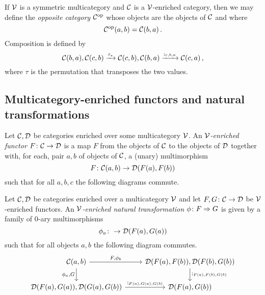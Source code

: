 \documentclass{article}
\begin{document}
\begin{remark}
  If ${\mathcal{V}}$ is a symmetric multicategory and ${\mathcal{C}}$ is a ${\mathcal{V}}$-enriched category, then we may define the \emph{opposite category} ${\mathcal{C}}^{\mathrm{op}}$ whose objects are the objects of ${\mathcal{C}}$ and where
  \[
    {\mathcal{C}}^{\mathrm{op}}(a,b)={\mathcal{C}}(b,a)\,.
    \]
  Composition is defined by
  \[
    {\mathcal{C}}(b,a),{\mathcal{C}}(c,b) \xrightarrow{\tau_*}
    {\mathcal{C}}(c,b),{\mathcal{C}}(b,a) \xrightarrow{;_{c,b,a}}
    {\mathcal{C}}(c,a)\,,
    \]
  where $\tau$ is the permutation that transposes the two values.
\end{remark}

\subsection{Multicategory-enriched functors and natural transformations}

\begin{definition}
  Let ${\mathcal{C}},{\mathcal{D}}$ be categories enriched over some multicategory ${\mathcal{V}}$.  
  An \emph{${\mathcal{V}}$-enriched functor} $F \colon {\mathcal{C}} \to {\mathcal{D}}$ is a map $F$ from the objects of ${\mathcal{C}}$ to the objects of ${\mathcal{D}}$ together with, for each, pair $a,b$ of objects of ${\mathcal{C}}$, a (unary) multimorphism
  \[
    F \colon {\mathcal{C}}(a,b) \to {\mathcal{D}}(F(a),F(b))
    \]
  such that for all $a, b, c$ the following diagrams commute.
\end{definition}

\begin{definition}
  Let ${\mathcal{C}},{\mathcal{D}}$ be categories enriched over a multicategory ${\mathcal{V}}$ and let $F,G\colon {\mathcal{C}} \to {\mathcal{D}}$ be ${\mathcal{V}}$-enriched functors.
  An \emph{${\mathcal{V}}$-enriched natural transformation} $\phi\colon F \Rightarrow G$ is given by a family of $0$-ary multimorphisms
  \[
    \phi_a \colon \to {\mathcal{D}}(F(a),G(a))
    \]
  such that for all objects $a,b$ the following diagram commutes.
  \[
    \begin{tikzcd}
      \C(a,b) \arrow[r, "{F,\phi_b}"] \arrow[d, "{\phi_a,G}"']
        & \D(F(a),F(b)),\D(F(b),G(b)) \arrow[d, "{;_{F(a),F(b),G(b)}}"] \\
      \D(F(a),G(a)),\D(G(a),G(b)) \arrow[r, "{;_{F(a),G(a),G(b)}}"]
        & \D(F(a), G(b))
    \end{tikzcd}
    \]
\end{definition}
\end{document}
